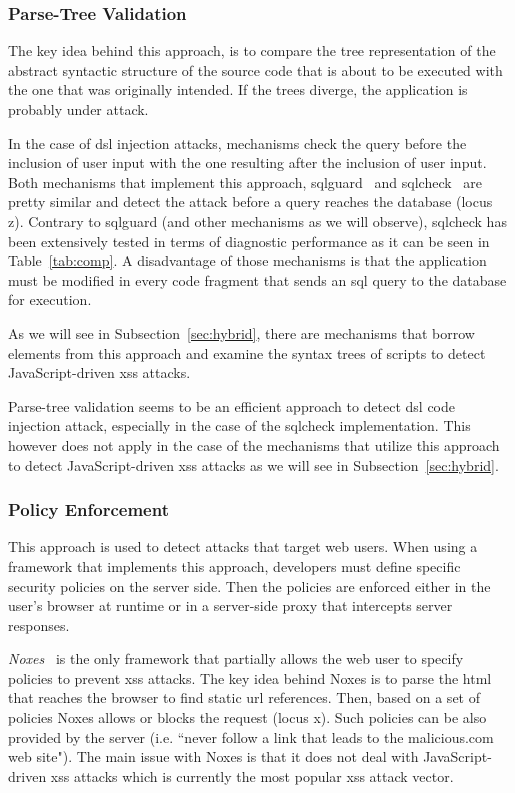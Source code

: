 \documentclass[conference]{IEEEtran}
\begin{document}
\subsubsection{Parse-Tree Validation}
\label{sec:tree}

The key idea behind this approach, is to compare
the tree representation of the abstract syntactic
structure of the source code that is about to be
executed with the one that was originally intended.
If the trees diverge, the application is probably
under attack.

In the case of {\sc dsl} injection attacks, mechanisms check 
the query before the inclusion of user input with the one
resulting after the inclusion of user input.
Both mechanisms that implement this approach,
{\sc sqlg}uard~\cite{BWS05} and
{\sc sql}check~\cite{SW06} are pretty similar
and detect the attack before a query reaches the
database (locus {\sc z}).
Contrary to {\sc sqlg}uard (and other
mechanisms as we will observe), {\sc sql}check has been
extensively tested in terms of diagnostic performance
as it can be seen in Table~\ref{tab:comp}.
A disadvantage of those mechanisms is that the
application must be modified in every code fragment
that sends an {\sc sql} query to the database for execution.

As we will see in Subsection~\ref{sec:hybrid},
there are mechanisms that borrow elements from
this approach and examine the syntax trees
of scripts to detect JavaScript-driven {\sc xss} attacks.

Parse-tree validation seems to be an efficient approach
to detect {\sc dsl} code injection attack,
especially in the case of the {\sc sql}check
implementation. This however does not apply in
the case of the mechanisms that utilize
this approach to detect JavaScript-driven {\sc xss} attacks
as we will see in Subsection~\ref{sec:hybrid}.

\subsubsection{Policy Enforcement}
\label{sec:policy}

This approach is used to detect attacks that target web users.
When using a framework that implements
this approach, developers must define
specific security policies on the server side.
Then the policies are enforced either in the user's
browser at runtime or in a server-side proxy that intercepts
server responses.

{\it Noxes}~\cite{KKVJ06,KJKV09} is the only
framework that partially allows the web
user to specify policies to prevent {\sc xss} attacks.
The key idea behind Noxes is to parse
the {\sc html} that reaches the browser to
find static {\sc url} references. Then, based on
a set of policies Noxes allows or blocks
the request (locus {\sc x}). Such policies
can be also provided by the server (i.e. ``never
follow a link that leads to the malicious.com
web site"). The main issue with Noxes is that
it does not deal with JavaScript-driven {\sc xss}
attacks which is currently the most popular
{\sc xss} attack vector.
\end{document}
